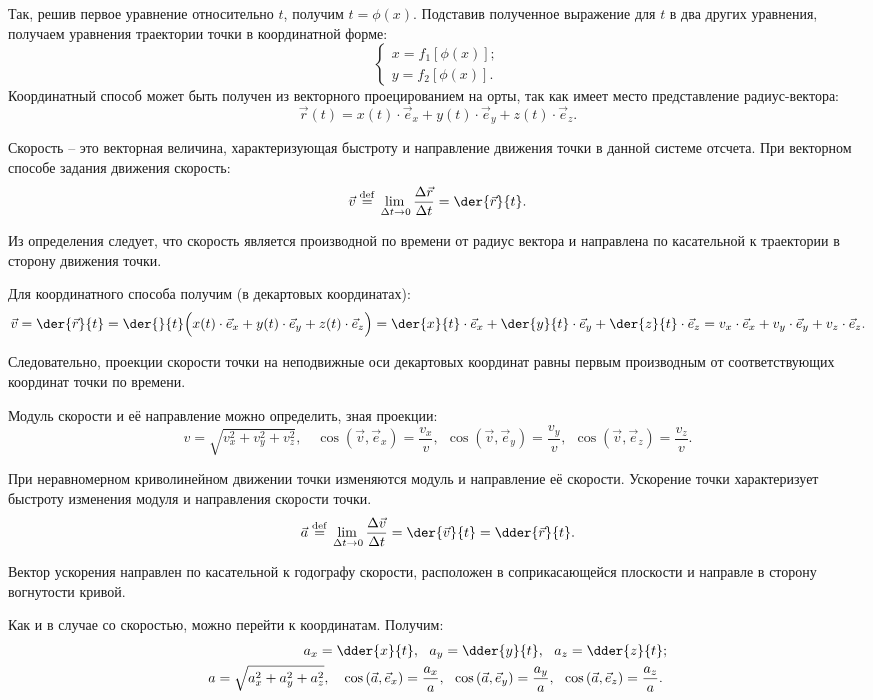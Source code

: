 Так, решив первое уравнение относительно \( t \), получим \( t = \phi(x) \).
Подставив полученное выражение для \( t \) в два других уравнения, получаем
уравнения траектории точки в координатной форме:
\[ \left\{ \begin{array}{l}
    x = f_1[\phi(x)]; \\
    y = f_2[\phi(x)].
\end{array} \right. \]
Координатный способ может быть получен из векторного проецированием на орты, так
как имеет место представление радиус-вектора:
\[
    \vec{r}(t) = x(t)\cdot\vec{e}_x + y(t)\cdot\vec{e}_y + z(t)\cdot\vec{e}_z.
\]


Скорость -- это векторная величина, характеризующая быстроту и направление
движения точки в данной системе отсчета. При векторном способе задания движения
скорость:
\[
    \vec{v} \defeq \lim_{\D t \to 0} \Der{\vec{r}}{t} = \der{\vec{r}}{t}.
\]

Из определения следует, что скорость является производной по времени от радиус
вектора и направлена по касательной к траектории в сторону движения точки.

Для координатного способа получим (в декартовых координатах):
\[
    \vec{v} = \der{\vec{r}}{t} = \der{}{t}\Big(x(t)\cdot\vec{e}_x +
    y(t)\cdot\vec{e}_y + z(t)\cdot\vec{e}_z\Big) = \der{x}{t}\cdot\vec{e}_x +
    \der{y}{t}\cdot\vec{e}_y + \der{z}{t}\cdot\vec{e}_z = v_x\cdot\vec{e}_x +
    v_y\cdot\vec{e}_y + v_z\cdot\vec{e}_z.
\]

Следовательно, проекции скорости точки на неподвижные оси декартовых координат
равны первым производным от соответствующих координат точки по времени.

Модуль скорости и её направление можно определить, зная проекции:
\[
    v = \sqrt{v_x^2 + v_y^2 + v_z^2}, \quad
    \cos\left(\vec{v}, \vec{e}_x\right) = \frac{v_x}{v},\ \ 
    \cos\left(\vec{v}, \vec{e}_y\right) = \frac{v_y}{v},\ \ 
    \cos\left(\vec{v}, \vec{e}_z\right) = \frac{v_z}{v}.
\]


При неравномерном криволинейном движении точки изменяются модуль и направление
её скорости. Ускорение точки характеризует быстроту изменения модуля и
направления скорости точки.
\[
    \vec{a} \defeq \lim_{\D t \to 0} \Der{\vec{v}}{t} = \der{\vec{v}}{t} =
    \dder{\vec{r}}{t}.
\]

Вектор ускорения направлен по касательной к годографу скорости, расположен в
соприкасающейся плоскости и направле в сторону вогнутости кривой.

Как и в случае со скоростью, можно перейти к координатам. Получим:
\begin{align*}
    a_x = \dder{x}{t},\ \ a_y & = \dder{y}{t},\ \ a_z = \dder{z}{t}; \\
    a = \sqrt{a_x^2 + a_y^2 + a_z^2}, \quad
    \cos\left(\vec{a}, \vec{e}_x\right) = \frac{a_x}{a}, & \ \ 
    \cos\left(\vec{a}, \vec{e}_y\right) = \frac{a_y}{a},\ \ 
    \cos\left(\vec{a}, \vec{e}_z\right) = \frac{a_z}{a}.
\end{align*}

\newpage %
